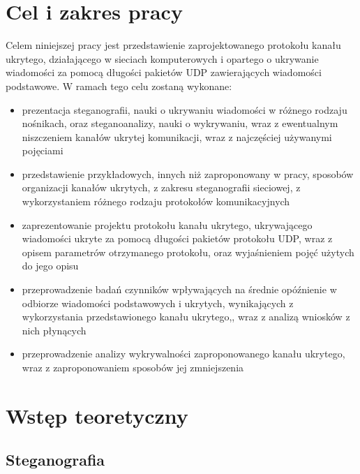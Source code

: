 \documentclass[a4paper, twoside, 12pt]{report}
\begin{document}
\chapter{Cel i zakres pracy}
    Celem niniejszej pracy jest przedstawienie zaprojektowanego protokołu kanału
    ukrytego, działającego w sieciach komputerowych i  opartego o ukrywanie wiadomości za pomocą długości pakietów UDP
    zawierających wiadomości podstawowe. W ramach tego celu zostaną wykonane:
    \begin{itemize}
        \item prezentacja steganografii, nauki o ukrywaniu wiadomości w różnego rodzaju nośnikach,
            oraz steganoanalizy, nauki o wykrywaniu, wraz z ewentualnym niszczeniem kanałów
            ukrytej komunikacji, wraz z najczęściej używanymi pojęciami
        \item przedstawienie przykładowych, innych niż zaproponowany w pracy,
            sposobów organizacji kanałów ukrytych, z zakresu steganografii sieciowej,
            z wykorzystaniem różnego rodzaju protokołów komunikacyjnych
        \item zaprezentowanie projektu protokołu kanału ukrytego, ukrywającego
            wiadomości ukryte za pomocą długości pakietów protokołu UDP, wraz
            z opisem parametrów otrzymanego protokołu, oraz wyjaśnieniem pojęć
            użytych do jego opisu
        \item przeprowadzenie badań czynników wpływających na średnie opóźnienie
            w odbiorze wiadomości podstawowych i ukrytych, wynikających z wykorzystania
            przedstawionego kanału ukrytego,, wraz z analizą wniosków
            z nich płynących
        \item przeprowadzenie analizy wykrywalności zaproponowanego kanału ukrytego,
            wraz z zaproponowaniem sposobów jej zmniejszenia
    \end{itemize}

\chapter{Wstęp teoretyczny}
    \section{Steganografia}
\end{document}
